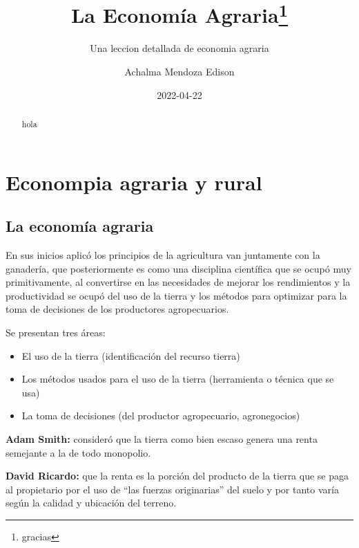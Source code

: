 \documentclass[
  letterpaper,
  DIV=11,
  numbers=noendperiod]{scrartcl}
\title{La Economía Agraria\thanks{gracias}}
\subtitle{Una leccion detallada de economia agraria}
\author{Achalma Mendoza Edison}
\date{2022-04-22}
\begin{document}
\maketitle
\begin{abstract}
hola
\end{abstract}
\ifdefined\Shaded\renewenvironment{Shaded}{\begin{tcolorbox}[frame hidden, breakable, sharp corners, interior hidden, borderline west={3pt}{0pt}{shadecolor}, boxrule=0pt, enhanced]}{\end{tcolorbox}}\fi

\hypertarget{econompia-agraria-y-rural}{%
\section{Econompia agraria y rural}\label{econompia-agraria-y-rural}}

\hypertarget{la-economuxeda-agraria}{%
\subsection{La economía agraria}\label{la-economuxeda-agraria}}

En sus inicios aplicó los principios de la agricultura van juntamente
con la ganadería, que posteriormente es como una disciplina científica
que se ocupó muy primitivamente, al convertirse en las necesidades de
mejorar los rendimientos y la productividad se ocupó del uso de la
tierra y los métodos para optimizar para la toma de decisiones de los
productores agropecuarios.

Se presentan tres áreas:

\begin{itemize}
\item
  El uso de la tierra (identificación del recurso tierra)
\item
  Los métodos usados para el uso de la tierra (herramienta o técnica que
  se usa)
\item
  La toma de decisiones (del productor agropecuario, agronegocios)
\end{itemize}

\textbf{Adam Smith:} consideró que la tierra como bien escaso genera una
renta semejante a la de todo monopolio.

\textbf{David Ricardo:} que la renta es la porción del producto de la
tierra que se paga al propietario por el uso de ``las fuerzas
originarias'' del suelo y por tanto varía según la calidad y ubicación
del terreno.
\end{document}

